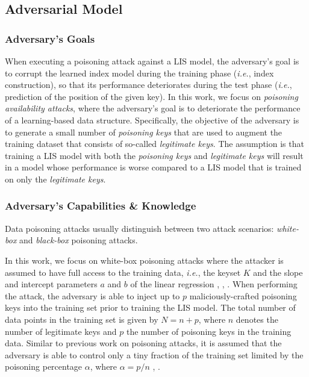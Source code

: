\documentclass[sigconf]{acmart}
\newcommand{\ie}[0]{\emph{i.e.},\xspace}
\begin{document}
\subsection{Adversarial Model}

\subsubsection{Adversary's Goals}
\label{sec:adversarys_goals} 

When executing a poisoning attack against a \ac{LIS} model, the adversary's goal is to corrupt the learned index model during the training phase (\ie index construction), so that its performance deteriorates during the test phase (\ie prediction of the position of the given key). In this work, we focus on \textit{poisoning availability attacks}, where the adversary's goal is to deteriorate the performance of a learning-based data structure. Specifically, the objective of the adversary is to generate a small number of \textit{poisoning keys} that are used to augment the training dataset that consists of so-called \textit{legitimate keys}. The assumption is that training a \ac{LIS} model with both the \textit{poisoning keys} and \textit{legitimate keys} will result in a model whose performance is worse compared to a \ac{LIS} model that is trained on only the \textit{legitimate keys}.

\subsubsection{Adversary's Capabilities \& Knowledge}
\label{sec:adversarys_capabilities_and_knowledge}
Data poisoning attacks usually distinguish between two attack scenarios: \textit{white-box} and \textit{black-box} poisoning attacks. 

In this work, we focus on white-box poisoning attacks where the attacker is assumed to have full access to the training data, \ie the keyset $K$ and the slope and intercept parameters $a$ and $b$ of the linear regression \cite{RN703}, \cite{RN704}, \cite{RN415}. When performing the attack, the adversary is able to inject up to $p$ maliciously-crafted poisoning keys into the training set prior to training the \ac{LIS} model.
The total number of data points in the training set is given by $N = n + p$, where $n$ denotes the number of legitimate keys and $p$ the number of poisoning keys in the training data. Similar to previous work on poisoning attacks, it is assumed that the adversary is able to control only a tiny fraction of the training set limited by the poisoning percentage $\alpha$, where $\alpha = p / n$  \cite{RN461}, \cite{RN706}.
\end{document}
